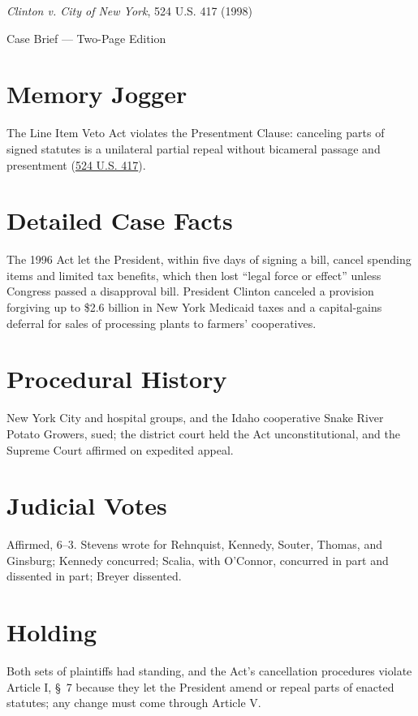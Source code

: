 \documentclass[12pt]{article}
\begin{document}
\begin{center}
{\LARGE \textit{Clinton v. City of New York}, 524 U.S. 417 (1998)\par}
\vspace{0.5em}
{\large Case Brief --- Two-Page Edition\par}
\end{center}

\section{Memory Jogger}
The Line Item Veto Act violates the Presentment Clause: canceling parts of signed statutes is a unilateral partial repeal without bicameral passage and presentment (\href{https://supreme.justia.com/cases/federal/us/524/417/}{524 U.S. 417}).

\section{Detailed Case Facts}
The 1996 Act let the President, within five days of signing a bill, cancel spending items and limited tax benefits, which then lost ``legal force or effect'' unless Congress passed a disapproval bill. President Clinton canceled a provision forgiving up to \$2.6 billion in New York Medicaid taxes and a capital-gains deferral for sales of processing plants to farmers' cooperatives.

\section{Procedural History}
New York City and hospital groups, and the Idaho cooperative Snake River Potato Growers, sued; the district court held the Act unconstitutional, and the Supreme Court affirmed on expedited appeal.

\section{Judicial Votes}
Affirmed, 6--3. Stevens wrote for Rehnquist, Kennedy, Souter, Thomas, and Ginsburg; Kennedy concurred; Scalia, with O'Connor, concurred in part and dissented in part; Breyer dissented.

\section{Holding}
Both sets of plaintiffs had standing, and the Act's cancellation procedures violate Article I, \S~7 because they let the President amend or repeal parts of enacted statutes; any change must come through Article V.
\end{document}
